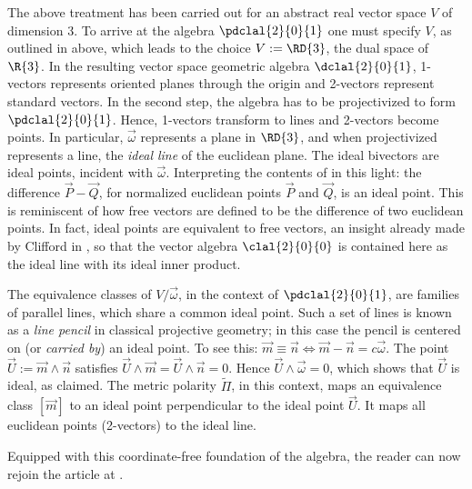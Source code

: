 \documentclass{birkjour}
\newcommand{\vsp}{V\xspace}
\begin{document}
The above treatment has been carried out for an abstract real vector space $\vsp$ of dimension 3.  To arrive at the algebra $\pdclal{2}{0}{1}$ one must specify $\vsp$, as outlined in  above, which leads to the choice  $\vsp := \RD{3}$, the dual space of $\R{3}$. In the resulting  vector space geometric algebra $\dclal{2}{0}{1}$, 1-vectors represents oriented planes through the origin and 2-vectors represent standard vectors.  In the second step, the algebra has to be projectivized to form $\pdclal{2}{0}{1}$.   Hence, 1-vectors transform to lines and 2-vectors become points.  In particular, $\vec{\omega}$ represents a plane in $\RD{3}$, and when projectivized represents a line, the \emph{ideal line} of the euclidean plane.   The ideal bivectors are ideal points, incident with $\vec{\omega}$.  Interpreting the contents of  in this light: the difference $\vec{P}-\vec{Q}$, for normalized euclidean points $\vec{P}$ and $\vec{Q}$, is an ideal point.  This is reminiscent of how free vectors are defined to be the difference of two euclidean points. In fact,  ideal points are equivalent to free vectors, an insight already made by Clifford in \cite{clifford73}, so that the vector algebra $\clal{2}{0}{0}$ is contained here as the ideal line with its ideal inner product.  

The equivalence classes of $\vsp/\vec{\omega}$, in the context of $\pdclal{2}{0}{1}$, are families of parallel lines, which share a common ideal point. Such a set of lines is known as a \emph{line pencil} in classical projective geometry; in this case the pencil is centered on (or \emph{carried by}) an ideal point.   To see this:  $\vec{m} \equiv \vec{n} \iff \vec{m} - \vec{n} = c\vec{\omega}$.  The  point $\vec{U} := \vec{m} \wedge \vec{n}$ satisfies $\vec{U} \wedge \vec{m} = \vec{U} \wedge  \vec{n} = 0$.  Hence $\vec{U} \wedge \vec{\omega} = 0$, which shows that $\vec{U}$ is ideal, as claimed.
The metric polarity $\widetilde{\Pi}$,  in this context, maps an equivalence class $[\vec{m}]$ to an ideal point perpendicular to the ideal point $\vec{U}$.  It maps all euclidean points (2-vectors) to the ideal line.

Equipped with this coordinate-free foundation of the algebra, the reader can now rejoin the article at .

\end{document}
